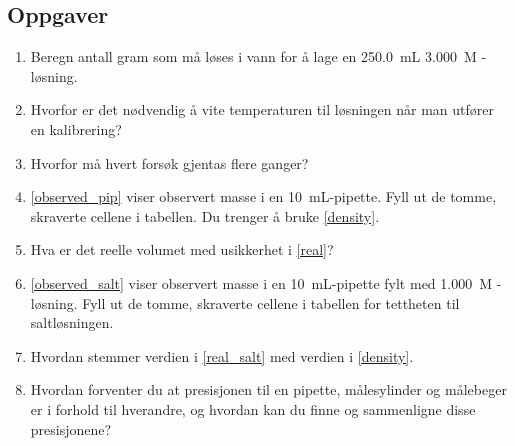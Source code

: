 \documentclass[hidelinks,12pt,norsk,a4paper,fleqn]{scrartcl}
\begin{document}
	\subsection{Oppgaver}
	\begin{enumerate}[label=\alph*)]
		\item Beregn antall gram  som må løses i vann for å lage en \SI{250.0}{mL} \SI{3.000}{M} -løsning.\label{exercise}
		
		\item Hvorfor er det nødvendig å vite temperaturen til løsningen når man utfører en kalibrering?
		
		\item Hvorfor må hvert forsøk gjentas flere ganger?
		
		\item \cref{observed_pip} viser observert masse i en \SI{10}{mL}-pipette. Fyll ut de tomme, skraverte cellene i tabellen. Du trenger å bruke \cref{density}. \label{real} 
		
		\item Hva er det reelle volumet med usikkerhet i \ref{real}?
		
		\item \cref{observed_salt} viser observert masse i en \SI{10}{mL}-pipette fylt med \SI{1.000}{M} -løsning. Fyll ut de tomme, skraverte cellene i tabellen for tettheten til saltløsningen. \label{real_salt} 
		
		\item Hvordan stemmer verdien i \ref{real_salt} med verdien i \cref{density}.
		
		\item Hvordan forventer du at presisjonen til en pipette, målesylinder og målebeger er i forhold til hverandre, og hvordan kan du finne og sammenligne disse presisjonene?	
			
	\end{enumerate}
\end{document}
